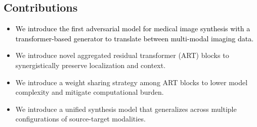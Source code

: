 \documentclass[journal,twoside,web]{ieeecolor}
\newcommand*{\revhl}{\textcolor{black}}
\begin{document}
\vspace{-2mm}
\subsection*{\textbf{Contributions} }
\begin{itemize}
    \item \revhl{We introduce the first adversarial model for medical image synthesis with a transformer-based generator to translate between multi-modal imaging data.}  
    \item We introduce novel aggregated residual transformer (ART) blocks to synergistically preserve localization and context.  
    \item We introduce a weight sharing strategy among ART blocks to lower model complexity and mitigate computational burden. 
    \item We introduce a unified synthesis model that generalizes across multiple configurations of source-target modalities.

\end{itemize}

\vspace{-2mm}
\end{document}
